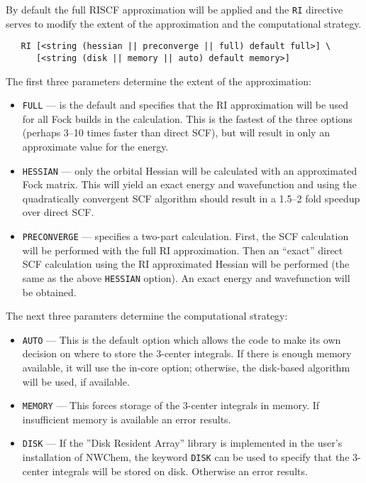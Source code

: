 By default the full RISCF approximation will be applied and the
\verb+RI+ directive serves to modify the extent of the approximation
and the computational strategy.

\begin{verbatim}
   RI [<string (hessian || preconverge || full) default full>] \
      [<string (disk || memory || auto) default memory>]
\end{verbatim}

The first three parameters determine the extent of the approximation:
\begin{itemize} 
\item \verb+FULL+ --- is the default and specifies that the RI
  approximation will be used for all Fock builds in the calculation.
  This is the fastest of the three options (perhaps 3--10 times faster
  than direct SCF), but will result in only an approximate value for
  the energy.

\item \verb+HESSIAN+ --- only the orbital Hessian will be calculated
  with an approximated Fock matrix.  This will yield an exact energy
  and wavefunction and using the quadratically convergent SCF
  algorithm should result in a 1.5--2 fold speedup over direct SCF.

\item \verb+PRECONVERGE+ --- specifies a two-part calculation.  First,
  the SCF calculation will be performed with the full RI
  approximation.  Then an ``exact'' direct SCF calculation using the
  RI approximated Hessian will be performed (the same as the above
  \verb+HESSIAN+ option).  An exact energy and wavefunction will be
  obtained.
\end{itemize}

The next three paramters determine the computational strategy:
\begin{itemize}
\item \verb+AUTO+ --- This is the default option which allows the code
  to make its own decision on where to store the 3-center integrals.
  If there is enough memory available, it will use the in-core option;
  otherwise, the disk-based algorithm will be used, if available.

\item \verb+MEMORY+ --- This forces storage of the 3-center integrals
  in memory.  If insufficient memory is available an error results.

\item \verb+DISK+ --- If the ''Disk Resident Array'' library is
  implemented in the user's installation of NWChem, the keyword
  \verb+DISK+ can be used to specify that the 3-center integrals will
  be stored on disk.  Otherwise an error results.
\end{itemize}

